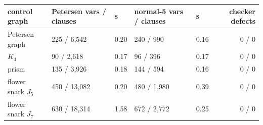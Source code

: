\begin{tabular}{lllllr}
\toprule
control graph & Petersen vars / clauses & s & normal-5 vars / clauses & s & checker defects\\
\midrule
Petersen graph & 225 / 6{,}542 & 0.20 & 240 / 990 & 0.16 & 0 / 0\\
$K_4$ & 90 / 2{,}618 & 0.17 & 96 / 396 & 0.17 & 0 / 0\\
prism & 135 / 3{,}926 & 0.18 & 144 / 594 & 0.16 & 0 / 0\\
flower snark $J_5$ & 450 / 13{,}082 & 0.20 & 480 / 1{,}980 & 0.39 & 0 / 0\\
flower snark $J_7$ & 630 / 18{,}314 & 1.58 & 672 / 2{,}772 & 0.25 & 0 / 0\\
\bottomrule
\end{tabular}
